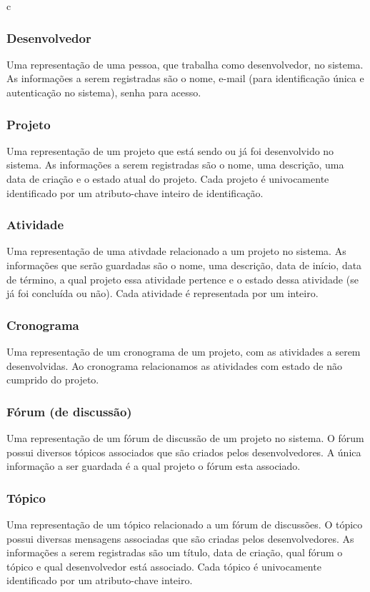 c\documentclass{article}
\begin{document}
		\subsubsection{Desenvolvedor}
		Uma representação de uma pessoa, que trabalha como desenvolvedor, no sistema. As informações a serem registradas são o nome, e-mail (para identificação única e autenticação no sistema), senha para acesso.

		\subsubsection{Projeto}
		Uma representação de um projeto que está sendo ou já foi desenvolvido no sistema. As informações a serem registradas são o nome, uma descrição, uma data de criação e o estado atual do projeto. Cada projeto é univocamente identificado por um atributo-chave inteiro de identificação.

		\subsubsection{Atividade}
		Uma representação de uma ativdade relacionado a um projeto no sistema. As informações que serão guardadas são o nome, uma descrição, data de início, data de término, a qual projeto essa atividade pertence e o estado dessa atividade (se já foi concluída ou não). Cada atividade é representada por um inteiro.

		\subsubsection{Cronograma}
		Uma representação de um cronograma de um projeto, com as atividades a serem desenvolvidas. Ao cronograma relacionamos as atividades com estado de não cumprido do projeto.

		\subsubsection{Fórum (de discussão)}
		Uma representação de um fórum de discussão de um projeto no sistema. O fórum possui diversos tópicos associados que são criados pelos desenvolvedores. A única informação a ser guardada é a qual projeto o fórum esta associado.

		\subsubsection{Tópico}
		Uma representação de um tópico relacionado a um fórum de discussões. O tópico possui diversas mensagens associadas que são criadas pelos desenvolvedores. As informações a serem registradas são um título, data de criação, qual fórum o tópico e qual desenvolvedor está associado. Cada tópico é univocamente identificado por um atributo-chave inteiro.
\end{document}

